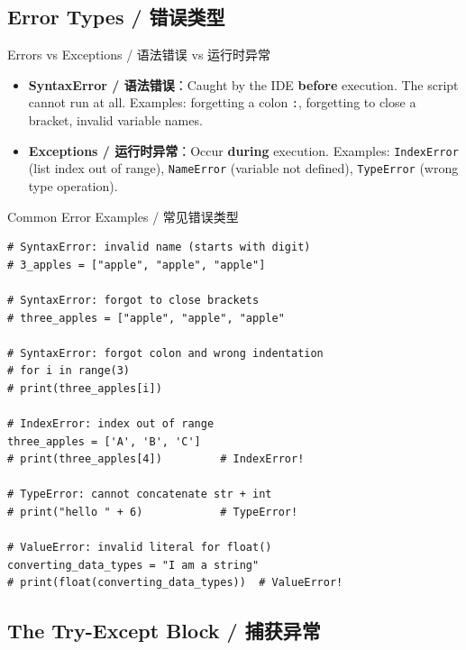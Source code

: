 \documentclass[11pt,a4paper]{report}
\let\oldtexttt\texttt
\renewcommand{\texttt}[1]{\textcolor{mainblue}{\oldtexttt{#1}}}
\begin{document}
\subsection{Error Types / 错误类型}

\begin{concept}{Errors vs Exceptions / 语法错误 vs 运行时异常}
    \begin{itemize}[itemsep=0.8em]
        \item \textbf{SyntaxError / 语法错误}：Caught by the IDE \textbf{before} execution. The script cannot run at all. Examples: forgetting a colon \texttt{:}, forgetting to close a bracket, invalid variable names.
        \item \textbf{Exceptions / 运行时异常}：Occur \textbf{during} execution. Examples: \texttt{IndexError} (list index out of range), \texttt{NameError} (variable not defined), \texttt{TypeError} (wrong type operation).
    \end{itemize}
\end{concept}

\begin{examplebox}{Common Error Examples / 常见错误类型}
\begin{lstlisting}
# SyntaxError: invalid name (starts with digit)
# 3_apples = ["apple", "apple", "apple"]

# SyntaxError: forgot to close brackets
# three_apples = ["apple", "apple", "apple"

# SyntaxError: forgot colon and wrong indentation
# for i in range(3)
# print(three_apples[i])

# IndexError: index out of range
three_apples = ['A', 'B', 'C']
# print(three_apples[4])         # IndexError!

# TypeError: cannot concatenate str + int
# print("hello " + 6)            # TypeError!

# ValueError: invalid literal for float()
converting_data_types = "I am a string"
# print(float(converting_data_types))  # ValueError!
\end{lstlisting}
\end{examplebox}

\subsection{The Try-Except Block / 捕获异常}
\end{document}
